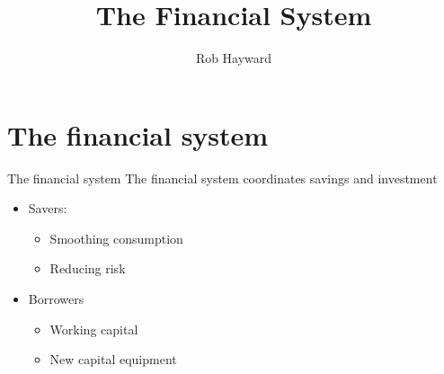 \documentclass[14pt,xcolor=pdftex,dvipsnames,table]{beamer}\usepackage[]{graphicx}\usepackage[]{color}
\title{The Financial System}
\author{Rob Hayward}
\begin{document}

\begin{frame}
\titlepage
\end{frame}


\section{The financial system}
\begin{frame}{The financial system}
The financial system coordinates savings and investment
\pause
\begin{itemize}[<+-| alert@+>]
\item Savers:
\begin{itemize}
\item Smoothing consumption
\item Reducing risk
\end{itemize}
\item Borrowers
\begin{itemize}
\item Working capital
\item New capital equipment
\end{itemize}
\end{itemize}
\end{frame}
\end{document}
